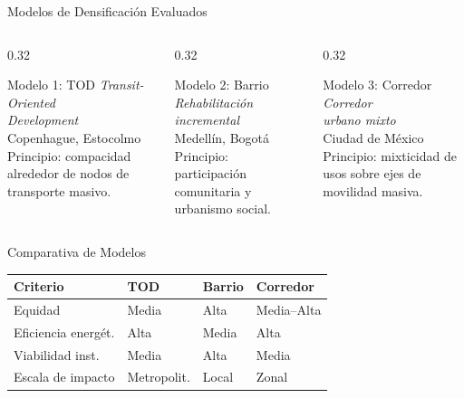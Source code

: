 \begin{frame}{Modelos de Densificación Evaluados}
  \begin{columns}[T]
    \begin{column}{0.32\textwidth}
      \begin{block}{Modelo 1: TOD}
        \textit{Transit-Oriented\\Development}\\[0.2cm]
        Copenhague, Estocolmo\\[0.1cm]
        {\small Principio: compacidad alrededor de nodos de transporte masivo.}
      \end{block}
    \end{column}
    \begin{column}{0.32\textwidth}
      \begin{block}{Modelo 2: Barrio}
        \textit{Rehabilitación\\incremental}\\[0.2cm]
        Medellín, Bogotá\\[0.1cm]
        {\small Principio: participación comunitaria y urbanismo social.}
      \end{block}
    \end{column}
    \begin{column}{0.32\textwidth}
      \begin{block}{Modelo 3: Corredor}
        \textit{Corredor\\urbano mixto}\\[0.2cm]
        Ciudad de México\\[0.1cm]
        {\small Principio: mixticidad de usos sobre ejes de movilidad masiva.}
      \end{block}
    \end{column}
  \end{columns}
\end{frame}

\begin{frame}{Comparativa de Modelos}
  \begin{table}
    \centering
    \small
    \begin{tabularx}{\textwidth}{@{} l X X X @{}}
      \toprule
      \textbf{Criterio}   & \textbf{TOD} & \textbf{Barrio} & \textbf{Corredor} \\
      \midrule
      Equidad             & Media        & Alta            & Media--Alta \\
      Eficiencia energét. & Alta         & Media           & Alta \\
      Viabilidad inst.    & Media        & Alta            & Media \\
      Escala de impacto   & Metropolit.  & Local           & Zonal \\
      \bottomrule
    \end{tabularx}
  \end{table}
\end{frame}

